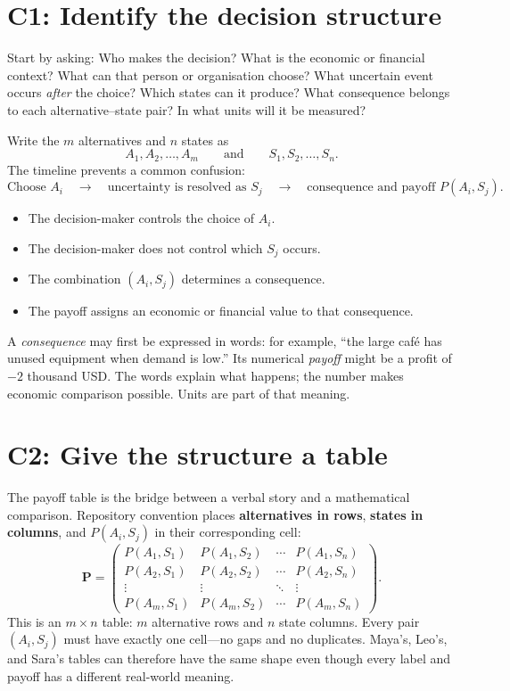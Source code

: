 	\section{C1: Identify the decision structure}
	
	Start by asking: Who makes the decision? What is the economic or financial
	context? What can that person or organisation choose? What uncertain event
	occurs \emph{after} the choice? Which states can it produce? What consequence
	belongs to each alternative--state pair? In what units will it be measured?
	
	Write the \(m\) alternatives and \(n\) states as
	\[
	A_1,A_2,\ldots,A_m
	\qquad\text{and}\qquad
	S_1,S_2,\ldots,S_n.
	\]
	The timeline prevents a common confusion:
	\[
	\text{Choose }A_i
	\quad\longrightarrow\quad
	\text{uncertainty is resolved as }S_j
	\quad\longrightarrow\quad
	\text{consequence and payoff }P(A_i,S_j).
	\]
	
	\begin{itemize}
		\item The decision-maker controls the choice of \(A_i\).
		\item The decision-maker does not control which \(S_j\) occurs.
		\item The combination \((A_i,S_j)\) determines a consequence.
		\item The payoff assigns an economic or financial value to that consequence.
	\end{itemize}
	
	A \emph{consequence} may first be expressed in words: for example, ``the large
	café has unused equipment when demand is low.'' Its numerical \emph{payoff}
	might be a profit of \(-2\) thousand USD. The words explain what happens; the
	number makes economic comparison possible. Units are part of that meaning.
	
	\section{C2: Give the structure a table}
	
	The payoff table is the bridge between a verbal story and a mathematical
	comparison. Repository convention places \textbf{alternatives in rows},
	\textbf{states in columns}, and \(P(A_i,S_j)\) in their corresponding cell:
	\[
	\mathbf P=
	\begin{pmatrix}
		P(A_1,S_1)&P(A_1,S_2)&\cdots&P(A_1,S_n)\\
		P(A_2,S_1)&P(A_2,S_2)&\cdots&P(A_2,S_n)\\
		\vdots&\vdots&\ddots&\vdots\\
		P(A_m,S_1)&P(A_m,S_2)&\cdots&P(A_m,S_n)
	\end{pmatrix}.
	\]
	This is an \(m\times n\) table: \(m\) alternative rows and \(n\) state
	columns. Every pair \((A_i,S_j)\) must have exactly one cell---no gaps and no
	duplicates. Maya's, Leo's, and Sara's tables can therefore have the same shape
	even though every label and payoff has a different real-world meaning.
	
